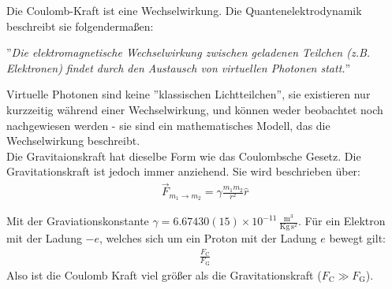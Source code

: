 \documentclass{scrartcl}
\begin{document}
\noindent Die Coulomb-Kraft ist eine Wechselwirkung. 
Die Quantenelektrodynamik beschreibt sie folgendermaßen:
\begin{center}
    ''\textit{Die elektromagnetische Wechselwirkung zwischen geladenen Teilchen (z.B. Elektronen)
    findet durch den Austausch von virtuellen Photonen statt.}''
\end{center}
Virtuelle Photonen sind keine ''klassischen Lichtteilchen'', sie existieren nur kurzzeitig während einer Wechselwirkung,
und können weder beobachtet noch nachgewiesen werden - sie sind ein mathematisches Modell, das die Wechselwirkung beschreibt.\\

\noindent Die Gravitaionskraft hat dieselbe Form wie das Coulombsche Gesetz. Die Gravitationskraft ist jedoch immer anziehend.
Sie wird beschrieben über: 
\begin{align}
    \vec{F}_{m_1\rightarrow m_2}=\gamma\frac{m_1m_2}{r^2}\hat{r}
\end{align}

Mit der Graviationskonstante $\gamma=6.67430(15)\times 10^{-11}\,\frac{\mathrm{m}^3}{\mathrm{Kg\,s^2}}$.
Für ein Elektron mit der Ladung $-e$, welches sich um ein Proton mit der Ladung $e$ bewegt gilt:
\begin{align}
    \frac{F_\mathrm{C}}{F_\mathrm{G}}
\end{align}
Also ist die Coulomb Kraft viel größer als die Gravitationskraft ($F_\mathrm{C}\gg F_\mathrm{G}$).
\end{document}
